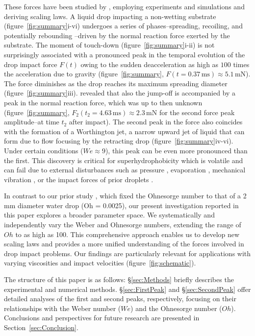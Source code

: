 \documentclass{jfm}
\begin{document}
These forces have been studied by \citet{zhang2022impact}, employing experiments and simulations and deriving scaling laws. 
A liquid drop impacting a non-wetting substrate (figure~\ref{fig:summary}i-vi) undergoes a series of phases--spreading, recoiling, and potentially rebounding \citep{chantelot2018rebonds}--driven by the normal reaction force exerted by the substrate. 
The moment of touch-down (figure~\ref{fig:summary}i-ii) \citep{wagner1932stoss, Philippi2016, Gordillo2018} is not surprisingly associated with a pronounced peak in the temporal evolution of the drop impact force $F(t)$ owing to the sudden deacceleration as high as $100$ times the acceleration due to gravity \citep{Clanet2004} (figure~\ref{fig:summary}, $F(t = 0.37\,\si{\milli\second}) \approx 5.1\,\si{\milli\newton}$). The force diminishes as the drop reaches its maximum spreading diameter (figure~\ref{fig:summary}iii). \citet{zhang2022impact} revealed that also the jump-off is accompanied by a peak in the normal reaction force, which was up to then unknown (figure~\ref{fig:summary}, $F_2(t_2 = 4.63\,\si{\milli\second}) \approx 2.3\,\si{\milli\newton}$ for the second force peak amplitude--at time $t_2$ after impact). The second peak in the force also coincides with the formation of a Worthington jet, a narrow upward jet of liquid that can form due to flow focusing by the retracting drop (figure~\ref{fig:summary}iv-vi). Under certain conditions ($We \approx 9$), this peak can be even more pronounced than the first. This discovery is critical for superhydrophobicity which is volatile and can fail due to external disturbances such as pressure \citep{Lafuma2003, Callies2005, Sbragaglia2007, Li2017}, evaporation \citep{Tsai2010, Chen2012, Papadopoulos2013},  mechanical vibration \citep{Bormashenko2007}, or the impact forces of prior droplets \citep{Bartolo2006Bouncing}.   

In contrast to our prior study \citet{zhang2022impact}, which fixed the Ohnesorge number to that of a 2 mm diameter water drop (Oh = 0.0025), our present investigation reported in this paper explores a broader parameter space. We systematically and independently vary the Weber and Ohnesorge numbers, extending the range of $Oh$ to as high as 100. This comprehensive approach enables us to develop new scaling laws and provides a more unified understanding of the forces involved in drop impact problems. Our findings are particularly relevant for applications with varying viscosities and impact velocities (figure~\ref{fig:schematic}). 

The structure of this paper is as follows: \S\ref{sec:Methods} briefly describes the experimental and numerical methods. \S\ref{sec:FirstPeak} and  \S\ref{sec:SecondPeak} offer detailed analyses of the first and second peaks, respectively, focusing on their relationships with the Weber number ($We$) and the Ohnesorge number ($Oh$). Conclusions and perspectives for future research are presented in Section~\ref{sec:Conclusion}.
\end{document}
